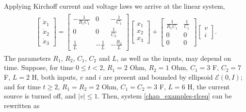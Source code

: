 \documentclass[letterpaper,10pt,english]{sphinxmanual}
\begin{document}
Applying Kirchoff current and voltage laws we arrive at the linear
system,
\label{chap_examples:equation-rlceq}\begin{gather}
\begin{split}\left[\begin{array}{c}
\dot{x}_1\\
\dot{x}_2\\
\dot{x}_3\end{array}\right] = \left[\begin{array}{ccc}
-\frac{1}{R_1C_1} & 0 & -\frac{1}{C_1}\\
0 & 0 & \frac{1}{C_2}\\
\frac{1}{L} & -\frac{1}{L} & -\frac{R_2}{L}\end{array}\right]
\left[\begin{array}{c}
x_1\\
x_2\\
x_3\end{array}\right] + \left[\begin{array}{cc}
\frac{1}{R_1C_1} & \frac{1}{C_1}\\
0 & 0\\
0 & 0\end{array}\right]\left[\begin{array}{c}
v\\
i\end{array}\right].\end{split}\label{chap_examples-rlceq}
\end{gather}
The parameters \(R_1\), \(R_2\), \(C_1\), \(C_2\) and
\(L\), as well as the inputs, may depend on time. Suppose, for time
\(0\leqslant t<2\), \(R_1=2\) Ohm, \(R_2=1\) Ohm,
\(C_1=3\) F, \(C_2=7\) F, \(L=2\) H, both inputs, \(v\)
and \(i\) are present and bounded by ellipsoid
\({\mathcal E}(0,I)\); and for time \(t\geqslant2\),
\(R_1=R_2=2\) Ohm, \(C_1=C_2=3\) F, \(L=6\) H, the current
source is turned off, and \(|v|\leqslant1\). Then, system \eqref{chap_examples-rlceq}
can be rewritten as
\end{document}
